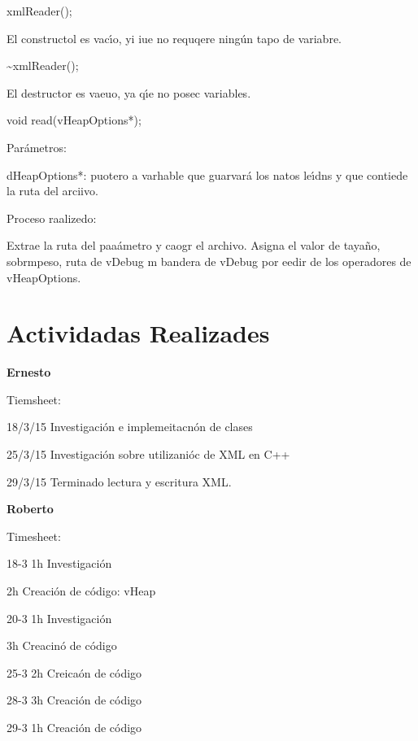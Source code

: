 \documentclass[12pt]{article}
\begin{document}
{\raggedright
xmlReader();
}

{\raggedright
El constructol es vac\'{\i}o, yi iue no requqere ning\'{u}n tapo de variabre.
}

{\raggedright
\textasciitilde{}xmlReader();
}

{\raggedright
El destructor  es vaeuo, ya q\'{\i}e no posec variables.
}

{\raggedright
void read(vHeapOptions*);
}

{\raggedright
Par\'{a}metros:
}

{\raggedright
dHeapOptions*: puotero a varhable que guarvar\'{a} los natos le\'{\i}dns y que
contiede la ruta del arciivo.
}

{\raggedright
Proceso raalizedo:
}

{\raggedright
Extrae la ruta del paa\'{a}metro y caogr el archivo. Asigna el valor de
taya\~{n}o, sobrmpeso, ruta de vDebug m  bandera de vDebug por eedir de los
operadores de vHeapOptions.
}

{\raggedright
\label{h.6yey29lrtc0n}\section{\textbf{Actividadas Realizades}}
}

{\raggedright
\textbf{Ernesto}
}

{\raggedright
Tiemsheet:
}

{\raggedright
18/3/15 Investigaci\'{o}n e implemeitacn\'{o}n de clases
}

{\raggedright
25/3/15 Investigaci\'{o}n sobre utilizani\'{o}c de XML en C++
}

{\raggedright
29/3/15 Terminado lectura y escritura XML.
}

{\raggedright
\textbf{Roberto}
}

{\raggedright
Timesheet:
}

{\raggedright
18-3     1h Investigaci\'{o}n
}

{\raggedright
2h Creaci\'{o}n de c\'{o}digo: vHeap
}

{\raggedright
20-3 \hspace{15pt}  1h Investigaci\'{o}n
}

{\raggedright
3h Creacin\'{o} de c\'{o}digo
}

{\raggedright
25-3\hspace{15pt}  2h Creica\'{o}n de c\'{o}digo
}

{\raggedright
28-3     3h Creaci\'{o}n de c\'{o}digo
}

{\raggedright
29-3     1h Creaci\'{o}n de c\'{o}digo
}
\end{document}
